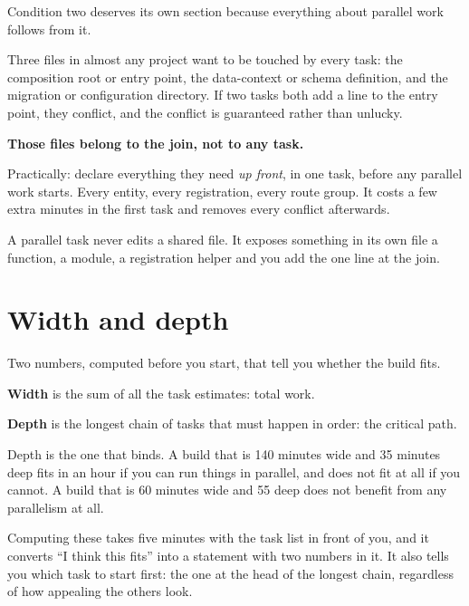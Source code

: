 Condition two deserves its own section because everything about parallel work
follows from it.

Three files in almost any project want to be touched by every task: the
composition root or entry point, the data-context or schema definition, and the
migration or configuration directory. If two tasks both add a line to the entry
point, they conflict, and the conflict is guaranteed rather than unlucky.

\begin{kitmethod}
\textbf{Those files belong to the join, not to any task.}

Practically: declare everything they need \emph{up front}, in one task, before
any parallel work starts. Every entity, every registration, every route group.
It costs a few extra minutes in the first task and removes every conflict
afterwards.

A parallel task never edits a shared file. It exposes something in its own file
\dash{} a function, a module, a registration helper \dash{} and you add the one
line at the join.
\end{kitmethod}


\section{Width and depth}

Two numbers, computed before you start, that tell you whether the build fits.

\textbf{Width} is the sum of all the task estimates: total work.

\textbf{Depth} is the longest chain of tasks that must happen in order: the
critical path.

Depth is the one that binds. A build that is 140 minutes wide and 35 minutes
deep fits in an hour if you can run things in parallel, and does not fit at all
if you cannot. A build that is 60 minutes wide and 55 deep does not benefit
from any parallelism at all.

\begin{kitnote}
Computing these takes five minutes with the task list in front of you, and it
converts ``I think this fits'' into a statement with two numbers in it. It also
tells you which task to start first: the one at the head of the longest chain,
regardless of how appealing the others look.
\end{kitnote}

